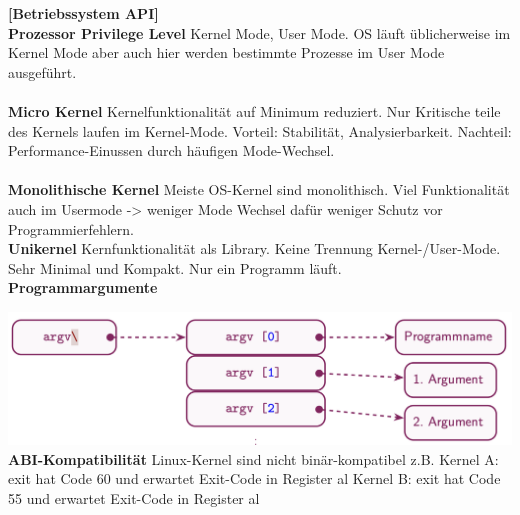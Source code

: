 \documentclass[8pt]{extarticle}
\let\oldtextbf\textbf
\renewcommand{\textbf}{\tiny\oldtextbf}
\begin{document}
\begin{multicols*}{5}
	\textbf{[Betriebssystem API]}\\
	\textbf{Prozessor Privilege Level}
	Kernel Mode, User Mode. OS läuft üblicherweise im Kernel Mode aber auch hier werden bestimmte Prozesse im User Mode ausgeführt.\\\\
	\textbf{Micro Kernel}
	Kernelfunktionalität auf Minimum reduziert. Nur Kritische teile des Kernels laufen im Kernel-Mode. Vorteil: Stabilität, Analysierbarkeit. Nachteil: Performance-Einussen durch häufigen Mode-Wechsel.\\\\
	\textbf{Monolithische Kernel}
	Meiste OS-Kernel sind monolithisch. Viel Funktionalität auch im Usermode -> weniger Mode Wechsel dafür weniger Schutz vor Programmierfehlern.\\
	
	\textbf{Unikernel}
	Kernfunktionalität als Library. Keine Trennung Kernel-/User-Mode. Sehr Minimal und Kompakt. Nur ein Programm läuft.\\
	
	\textbf{Programmargumente}
		
	\includegraphics[scale=0.24]{Programmargumente.png}
	\textbf{ABI-Kompatibilität} Linux-Kernel sind nicht binär-kompatibel z.B. Kernel A: exit hat Code 60 und erwartet Exit-Code in Register al Kernel B: exit hat Code 55 und erwartet Exit-Code in Register al\\
	

\end{multicols*}
\end{document}
